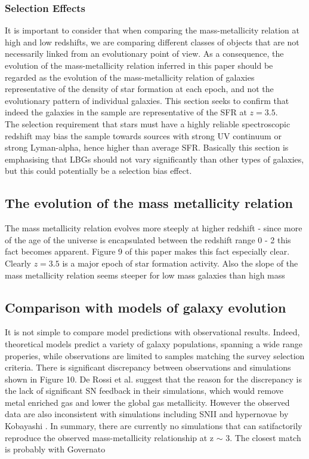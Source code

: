 \documentclass{literature}
\begin{document}
\subsubsection{Selection Effects}
It is important to consider that when comparing the mass-metallicity relation at high and low redshifts, we are comparing different classes of objects that are not necessarily linked from an evolutionary point of view. As a consequence, the evolution of the mass-metallicity relation inferred in this paper should be regarded as the evolution of the mass-metallicity relation of galaxies representative of the density of star formation at each epoch, and not the evolutionary pattern of individual galaxies. This section seeks to confirm that indeed the galaxies in the sample are representative of the SFR at $z = 3.5$. \\
The selection requirement that stars must have a highly reliable spectroscopic redshift may bias the sample towards sources with strong UV continuum or strong Lyman-alpha, hence higher than average SFR. Basically this section is emphasising that LBGs should not vary significantly than other types of galaxies, but this could potentially be a selection bias effect.
\subsection{The evolution of the mass metallicity relation}
The mass metallicity relation evolves more steeply at higher redshift - since more of the age of the universe is encapsulated between the redshift range 0 - 2 this fact becomes apparent. Figure 9 of this paper makes this fact especially clear. Clearly $z = 3.5$ is a major epoch of star formation activity. Also the slope of the mass metallicity relation seems steeper for low mass galaxies than high mass
\subsection{Comparison with models of galaxy evolution}
It is not simple to compare model predictions with observational results. Indeed, theoretical models predict a variety of galaxy populations, spanning a wide range properies, while observations are limited to samples matching the survey selection criteria. There is significant discrepancy between observations and simulations shown in Figure 10. De Rossi et al. \citep{deRossi_2007} suggest that the reason for the discrepancy is the lack of significant SN feedback in their simulations, which would remove metal enriched gas and lower the global gas metallicity. However the observed data are also inconsistent with simulations including SNII and hypernovae by Kobayashi \citep{Kobayashi_2007}. In summary, there are currently no simulations that can satifactorily reproduce the observed mass-metallicity relationship at z $\sim$ 3. The closest match is probably with Governato 
\end{document}
